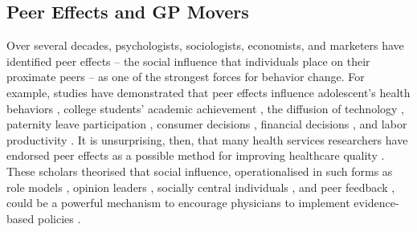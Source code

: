 \documentclass[11pt]{article}
\begin{document}
\subsection{Peer Effects and GP Movers}

Over several decades, psychologists, sociologists, economists, and marketers have identified peer effects -- the social influence that individuals place on their proximate peers -- as one of the strongest forces for behavior change. For example, studies have demonstrated that peer effects influence adolescent's health behaviors \citep{gaviriaSchoolBasedPeerEffects2001,lundborgHavingWrongFriends2006,aliEstimatingPeerEffects2011}, college students' academic achievement \citep{sacerdotePeerEffectsRandom2001}, the diffusion of technology \citep{bollingerPeerEffectsDiffusion2012}, paternity leave participation \citep{dahlPeerEffectsProgram2014}, consumer decisions \citep{morettiSocialLearningPeer2011}, financial decisions \citep{bursztynUnderstandingMechanismsUnderlying2014}, and labor productivity \citep{herbstPeerEffectsWorker2015}.
It is unsurprising, then, that many health services researchers have endorsed peer effects as a possible method for improving healthcare quality \citep{goodpastorMotivatingPhysicianBehaviour1996}. These scholars theorised that social influence, operationalised in such forms as role models \citep{kennyRoleModelingPhysicians2003}, opinion leaders \citep{locockUnderstandingRoleOpinion2001}, socially central individuals \citep{meltzerExploringUseSocial2010}, and peer feedback \citep{pronovostImprovingHealthcareQuality2012}, could be a powerful mechanism to encourage physicians to implement evidence-based policies \citep{phelpsVariationsMedicalPractice1993}.
\end{document}
